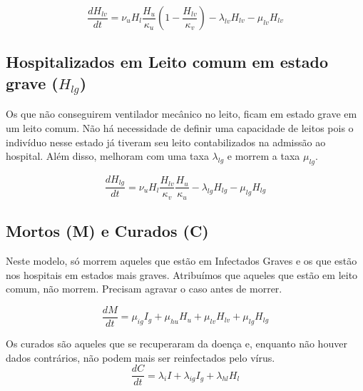 \documentclass[12pt,a4papper]{article}
\begin{document}
\begin{equation}
	\frac{dH_{lv}}{dt}=\nu_u H_l\frac{H_u}{\kappa_{u}}(1-\frac{H_{lv}}{\kappa_{v}})  - \lambda_{lv}H_{lv}-\mu_{lv}H_{lv}
\end{equation}
\subsection{Hospitalizados em Leito comum em estado grave ($H_{lg}$)}
Os que não conseguirem ventilador mecânico no leito, ficam em estado grave em um leito comum. Não há necessidade de definir uma capacidade de leitos pois o indivíduo nesse estado já tiveram seu leito contabilizados na admissão ao hospital. Além disso, melhoram com uma taxa $\lambda_{lg}$ e morrem a taxa $\mu_{lg}$.

\begin{equation}
	\frac{dH_{lg}}{dt}=\nu_u H_l\frac{H_{lv}}{\kappa_{v}}\frac{H_u}{\kappa_{u}} -\lambda_{lg}H_{lg}-\mu_{lg}H_{lg} 
\end{equation}

\subsection{Mortos (M) e Curados (C)}
Neste modelo, só morrem aqueles que estão em Infectados Graves e os que estão nos hospitais em estados mais graves. Atribuímos que aqueles que estão em leito comum, não morrem. Precisam agravar o caso antes de morrer.

\begin{equation}
	\frac{dM}{dt}=\mu_{ig}I_{g} + \mu_{hu}H_u +\mu_{lv} H_{lv}+\mu_{lg} H_{lg}
\end{equation}

Os curados são aqueles que se recuperaram da doença e, enquanto não houver dados contrários, não podem mais ser reinfectados pelo vírus.
\begin{equation}
	\frac{dC}{dt}=\lambda_i I + \lambda_{ig} I_g +\lambda_{hl}H_l 
\end{equation}
\end{document}
